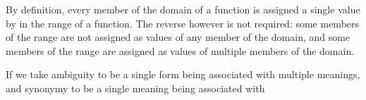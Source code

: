 \documentclass[MilwayThesis]{subfile}
\begin{document}
By definition, every member of the domain of a function is assigned a single value by in the range of a function.
	The reverse however is not required: some members of the range are not assigned as values of any member of the domain, and some members of the range are assigned as values of multiple members of the domain.
	
	If we take ambiguity to be a single form being associated with multiple meanings, and synonymy to be a single meaning being associated with 
\end{document}
